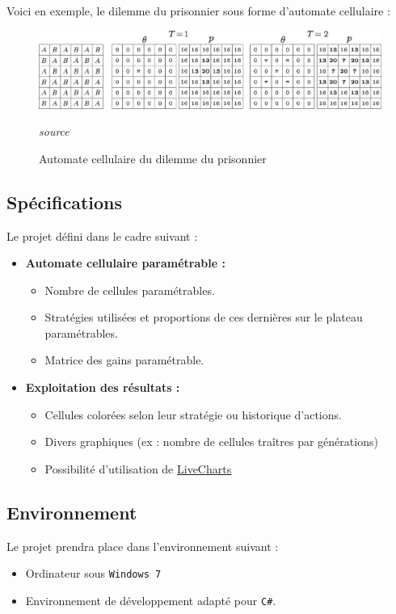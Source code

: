 \documentclass[a4paper, french]{article}
\begin{document}
Voici en exemple, le dilemme du prisonnier sous forme d'automate cellulaire :

\begin{figure}[htp]
    \centering
    \includegraphics[width=\linewidth]{dilemma.png}
    \caption{Automate cellulaire du dilemme du prisonnier} 
    \textit{source} \cite{DilemmaAutomata}
\end{figure}

\pagebreak{}
\subsection{Spécifications}
Le projet défini dans le cadre suivant :

\begin{itemize}
    \item[] \textbf{Automate cellulaire paramétrable :}
    \begin{itemize}
        \item Nombre de cellules paramétrables.
        \item Stratégies utilisées et proportions de ces dernières sur le plateau paramétrables.
        \item Matrice des gains \cite{MatriceGains} paramétrable.
    \end{itemize}
    \item[] \textbf{Exploitation des résultats :}
    \begin{itemize}
        \item Cellules colorées selon leur stratégie ou historique d'actions.
        \item Divers graphiques (ex : nombre de cellules traîtres par générations)
        \item Possibilité d'utilisation de \href{https://lvcharts.net/}{LiveCharts} \cite{LVCharts}
    \end{itemize}
\end{itemize}

\subsection{Environnement}
Le projet prendra place dans l'environnement suivant :
\begin{itemize}
    \item Ordinateur sous \texttt{Windows 7}
    \item Environnement de développement adapté pour \texttt{C\#}.
\end{itemize}
\end{document}
